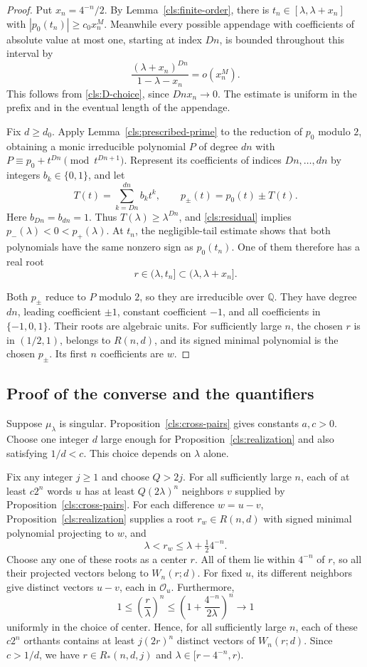 \begin{proof}
Put $x_n=4^{-n}/2$.  By Lemma~\ref{cls:finite-order}, there is
$t_n\in[\lambda,\lambda+x_n]$ with
$|p_0(t_n)|\geq c_0x_n^M$.  Meanwhile every possible appendage with
coefficients of absolute value at most one, starting at index $Dn$,
is bounded throughout this interval by
\[
  \frac{(\lambda+x_n)^{Dn}}{1-\lambda-x_n}=o(x_n^M).
\]
This follows from \eqref{cls:D-choice}, since
$Dn x_n\to0$.  The estimate is uniform in the prefix and in the
eventual length of the appendage.

Fix $d\geq d_0$.  Apply Lemma~\ref{cls:prescribed-prime} to the
reduction of $p_0$ modulo $2$, obtaining a monic irreducible polynomial
$P$ of degree $dn$ with
$P\equiv p_0+t^{Dn}\pmod{t^{Dn+1}}$.
Represent its coefficients of indices $Dn,\ldots,dn$ by integers
$b_k\in\{0,1\}$, and let
\[
  T(t)=\sum_{k=Dn}^{dn}b_kt^k,
  \qquad p_\pm(t)=p_0(t)\pm T(t).
\]
Here $b_{Dn}=b_{dn}=1$.  Thus $T(\lambda)\geq\lambda^{Dn}$, and
\eqref{cls:residual} implies
$p_-(\lambda)<0<p_+(\lambda)$.  At $t_n$, the negligible-tail
estimate shows that both polynomials have the same nonzero sign as
$p_0(t_n)$.  One of them therefore has a real root
\[
  r\in(\lambda,t_n]\subset(\lambda,\lambda+x_n].
\]

Both $p_\pm$ reduce to $P$ modulo $2$, so they are irreducible over
$\mathbb Q$.  They have degree $dn$, leading coefficient $\pm1$,
constant coefficient $-1$, and all coefficients in $\{-1,0,1\}$.
Their roots are algebraic units.  For sufficiently large $n$, the
chosen $r$ is in $(1/2,1)$, belongs to $R(n,d)$, and its signed minimal
polynomial is the chosen $p_\pm$.  Its first $n$ coefficients are $w$.
\end{proof}

\subsection{Proof of the converse and the quantifiers}

Suppose $\mu_\lambda$ is singular.  Proposition~\ref{cls:cross-pairs}
gives constants $a,c>0$.  Choose one integer $d$ large enough for
Proposition~\ref{cls:realization} and also satisfying $1/d<c$.
This choice depends on $\lambda$ alone.

Fix any integer $j\geq1$ and choose $Q>2j$.  For all sufficiently
large $n$, each of at least $c2^n$ words $u$ has at least
$Q(2\lambda)^n$ neighbors $v$ supplied by
Proposition~\ref{cls:cross-pairs}.  For each difference $w=u-v$,
Proposition~\ref{cls:realization} supplies a root $r_w\in R(n,d)$
with signed minimal polynomial projecting to $w$, and
\[
  \lambda<r_w\leq\lambda+\tfrac12 4^{-n}.
\]
Choose any one of these roots as a center $r$.  All of them lie within
$4^{-n}$ of $r$, so all their projected vectors belong to $W_n(r;d)$.
For fixed $u$, its different neighbors give distinct vectors $u-v$,
each in $\mathcal O_u$.  Furthermore,
\[
  1\leq\left(\frac r\lambda\right)^n
       \leq\left(1+\frac{4^{-n}}{2\lambda}\right)^n\longrightarrow1
\]
uniformly in the choice of center.  Hence, for all sufficiently large
$n$, each of these $c2^n$ orthants contains at least
$j(2r)^n$ distinct vectors of $W_n(r;d)$.  Since $c>1/d$, we have
$r\in R_*(n,d,j)$ and
$\lambda\in[r-4^{-n},r)$.

